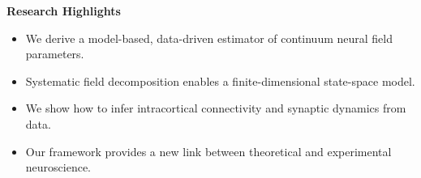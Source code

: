 \documentclass[]{article}
\begin{document}
\textbf{Research Highlights}
\begin{itemize}
	\item We derive a model-based, data-driven estimator of continuum neural field parameters.
	\item Systematic field decomposition enables a finite-dimensional state-space model.
	\item We show how to infer intracortical connectivity and synaptic dynamics from data.
	\item Our framework provides a new link between theoretical and experimental neuroscience.
\end{itemize}
\end{document}
